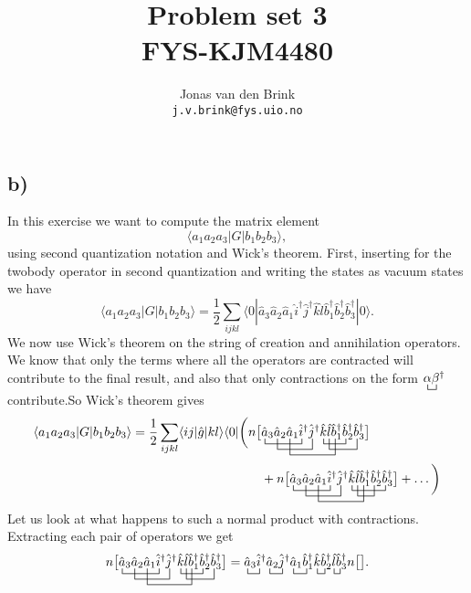 \documentclass[a4paper, 11pt, notitlepage, english]{article}
\author{Jonas van den Brink \\ \texttt{j.v.brink@fys.uio.no}}
\title{Problem set 3 \\ FYS-KJM4480}
\newcommand{\bra}[1]{\langle #1|}
\newcommand{\op}[1]{\hat{#1}}
\newcommand{\braopket}[3]{\langle #1 | {#2} | #3 \rangle}
\begin{document}
\subsection*{b)}
In this exercise we want to compute the matrix element
$$\braopket{a_1a_2a_3}{G}{b_1b_2b_3},$$
using second quantization notation and Wick's theorem. First, inserting for the twobody operator in second quantization and writing the states as vacuum states we have
$$\braopket{a_1a_2a_3}{G}{b_1b_2b_3} = \frac{1}{2}\sum_{ijkl} \braopket{0}{\op{a}_3 \op{a}_2 \op{a}_1 \op{i}^\dag \op{j}^\dag \op{k} \op{l} \op{b}_1^\dag\op{b}_2^\dag\op{b}_3^\dag}{0}.$$
We now use Wick's theorem on the string of creation and annihilation operators. We know that only the terms where all the operators are contracted will contribute to the final result, and also that only contractions on the form $\bcontraction{}{\alpha}{}{\beta}\alpha \beta^\dag$ contribute.So Wick's theorem gives
\begin{align*}
\braopket{a_1a_2a_3}{G}{b_1b_2b_3} = \frac{1}{2}\sum_{ijkl} \braopket{ij}{\op{g}}{kl} \bra{0} \bigg(
&
%
n\big[
\bcontraction{}{a}{_1a_2 a_3}{i}
\bcontraction[2ex]{a_1}{a}{_2 a_3 i^\dag}{j}
\bcontraction[3ex]{a_1a_2}{a}{_3i^\dag j^\dag k l}{a}
\bcontraction[1ex]{a_1a_2a_3 i^\dag j^\dag}{k}{l b_1^\dag }{b}
\bcontraction[2ex]{a_1a_2a_3 i^\dag j^\dag k}{l}{b_1^\dag b_2^\dag}{b}
\op{a}_3 \op{a}_2 \op{a}_1 \op{i}^\dag \op{j}^\dag \op{k} \op{l} \op{b}_1^\dag\op{b}_2^\dag\op{b}_3^\dag\big] \\[0.1cm]
%
%
&\quad+n\big[
\bcontraction{}{a}{_1a_2 a_3}{i}
\bcontraction[2ex]{a_1}{a}{_2 a_3 i^\dag}{j}
\bcontraction[3ex]{a_1a_2}{a}{_3i^\dag j^\dag k l}{a}
\bcontraction[1ex]{a_1a_2a_3 i^\dag j^\dag}{k}{l b_1^\dag b_2^\dag}{b}
\bcontraction[2ex]{a_1a_2a_3 i^\dag j^\dag k}{l}{b_1^\dag}{b}
\op{a}_3 \op{a}_2 \op{a}_1 \op{i}^\dag \op{j}^\dag \op{k} \op{l} \op{b}_1^\dag\op{b}_2^\dag\op{b}_3^\dag\big] +\ldots \bigg)
\end{align*}
Let us look at what happens to such a normal product with contractions. Extracting each pair of operators we get
$$n\big[
\bcontraction{}{a}{_1a_2 a_3}{i}
\bcontraction[2ex]{a_1}{a}{_2 a_3 i^\dag}{j}
\bcontraction[3ex]{a_1a_2}{a}{_3i^\dag j^\dag k l}{b}
\bcontraction[1ex]{a_1a_2a_3 i^\dag j^\dag}{k}{l b_1^\dag}{b}
\bcontraction[2ex]{a_1a_2a_3 i^\dag j^\dag k}{l}{b_1^\dag b_2^\dag}{b}
\op{a}_3 \op{a}_2 \op{a}_1 \op{i}^\dag \op{j}^\dag \op{k} \op{l} \op{b}_1^\dag\op{b}_2^\dag\op{b}_3^\dag\big] = 
%
\bcontraction{}{a}{_3}{i} \op{a}_3\op{i}^\dag
\bcontraction{}{a}{_2}{j} \op{a}_2\op{j}^\dag
\bcontraction{}{a}{_1}{a} \op{a}_1\op{b}_1^\dag
\bcontraction{}{k}{}{a} \op{k}\op{b}_2^\dag
\bcontraction{}{l}{}{a} \op{l}\op{b}_3^\dag n\big[\big].
$$ 
\end{document}
